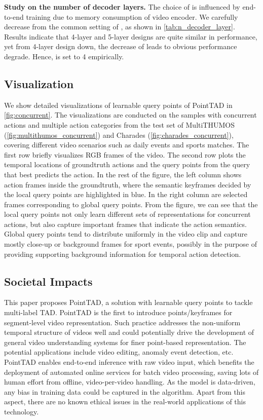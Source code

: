 \documentclass{article}
\renewcommand{\paragraph}[1]{\vspace{1.25mm}\noindent\textbf{#1}}
\begin{document}
\paragraph{Study on the number of decoder layers.}
The choice of  is influenced by end-to-end training due to memory consumption of video encoder. We carefully decrease  from the common setting of , as shown in \cref{tab:n_decoder_layer}. Results indicate that 4-layer and 5-layer designs are quite similar in performance, yet from 4-layer design down, the decrease of  leads to obvious performance degrade. Hence,  is set to 4 empirically.


\subsection{Visualization}
We show detailed visualizations of learnable query points of PointTAD in \cref{fig:concurrent}. The visualizations are conducted on the samples with concurrent actions and multiple action categories from the test set of MultiTHUMOS (\cref{fig:multithumos_concurrent}) and Charades (\cref{fig:charades_concurrent}), covering different video scenarios such as daily events and sports matches. The first row briefly visualizes RGB frames of the video. The second row plots the temporal locations of groundtruth actions and the query points from the query that best predicts the action. In the rest of the figure, the left column shows action frames inside the groundtruth, where the semantic keyframes decided by the local query points are highlighted in blue. In the right column are selected frames corresponding to global query points. From the figure, we can see that the local query points not only learn different sets of representations for concurrent actions, but also capture important frames that indicate the action semantics. Global query points tend to distribute uniformly in the video clip and capture mostly close-up or background frames for sport events, possibly in the purpose of providing supporting background information for temporal action detection. 

\subsection{Societal Impacts}
\label{sec:societal}
This paper proposes PointTAD, a solution with learnable query points to tackle multi-label TAD. PointTAD is the first to introduce points/keyframes for segment-level video representation. Such practice addresses the non-uniform temporal structure of videos well and could potentially drive the development of general video understanding systems for finer point-based representation. 
The potential applications include video editing, anomaly event detection, etc. PointTAD enables end-to-end inference with raw video input, which benefits the deployment of automated online services for batch video processing, saving lots of human effort from offline, video-per-video handling.
As the model is data-driven, any bias in training data could be captured in the algorithm. Apart from this aspect, there are no known ethical issues in the real-world applications of this technology.
\end{document}
